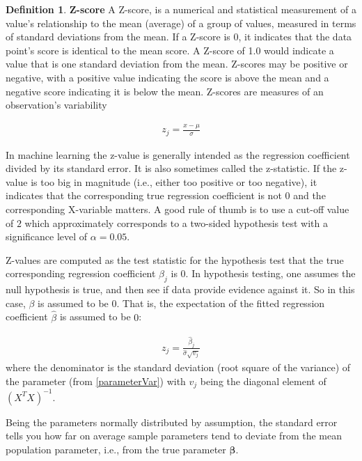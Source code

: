 \documentclass[12pt, letterpaper]{article}
\theoremstyle{definition}
\newtheorem{definition}{Definition}[section]
\newcommand{\be}{\mathbf{\beta}}
\begin{document}
\begin{definition}{\textbf{Z-score}}
A Z-score, is a numerical and statistical measurement of a value's relationship to the mean (average) of a group of values, measured in terms of standard deviations from the mean. If a Z-score is 0, it indicates that the data point's score is identical to the mean score. A Z-score of 1.0 would indicate a value that is one standard deviation from the mean. Z-scores may be positive or negative, with a positive value indicating the score is above the mean and a negative score indicating it is below the mean. Z-scores are measures of an observation's variability

\begin{align}
z_j=\frac{x - \mu}{\sigma}
\end{align}

In machine learning the z-value is generally intended as the regression coefficient divided by its standard error. It is also sometimes called the z-statistic. If the z-value is too big in magnitude (i.e., either too positive or too negative), it indicates that the corresponding true regression coefficient is not $0$ and the corresponding X-variable matters. A good rule of thumb is to use a cut-off value of $2$ which approximately corresponds to a two-sided hypothesis test with a significance level of $\alpha=0.05$.

Z-values are computed as the test statistic for the hypothesis test that the true corresponding regression coefficient $\beta_j$ is $0$. In hypothesis testing, one assumes the null hypothesis is true, and then see if data provide evidence against it. So in this case, $\beta$ is assumed to be  $0$. That is, the expectation of the fitted regression coefficient $\hat{\beta}$ is assumed to be $0$:

\begin{align}
z_j =\frac{\hat{\beta}_j}{\hat{\sigma} \sqrt{v_j}}
\end{align}
where the denominator is the standard deviation (root square of the variance) of the parameter (from \ref{parameterVar}) with $v_j$ being the diagonal element of $(X^TX)^{-1}$.
\end{definition}

Being the parameters normally distributed by assumption, the standard error tells you how far on average sample parameters tend to deviate from the mean population parameter, i.e., from the true parameter $\be$.
\end{document}
